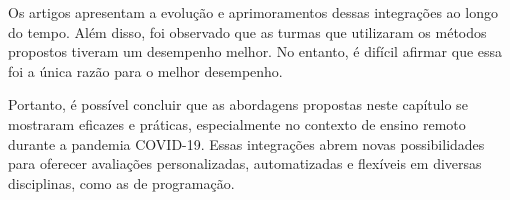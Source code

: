Os artigos apresentam a evolução e aprimoramentos dessas integrações ao longo do tempo. Além disso, foi observado que as turmas que utilizaram os métodos propostos tiveram um desempenho melhor. No entanto, é difícil afirmar que essa foi a única razão para o melhor desempenho.

Portanto, é possível concluir que as abordagens propostas neste capítulo se mostraram eficazes e práticas, especialmente no contexto de ensino remoto durante a pandemia COVID-19. Essas integrações abrem novas possibilidades para oferecer avaliações personalizadas, automatizadas e flexíveis em diversas disciplinas, como as de programação.
